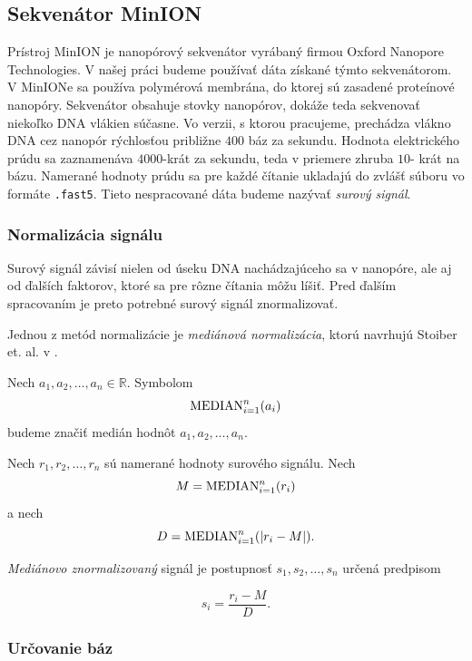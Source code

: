 
\subsection{Sekvenátor MinION}

Prístroj MinION je nanopórový sekvenátor vyrábaný firmou Oxford Nanopore Technologies. V našej práci 
budeme používať dáta získané týmto sekvenátorom. V MinIONe sa používa polymérová membrána, do ktorej sú 
zasadené proteínové nanopóry. Sekvenátor obsahuje stovky nanopórov, dokáže teda sekvenovať niekoľko DNA 
vlákien súčasne.
Vo verzii, s ktorou pracujeme, prechádza vlákno DNA cez nanopór rýchlosťou približne $400$ báz za 
sekundu. Hodnota elektrického prúdu sa zaznamenáva $4000$-krát za sekundu, teda v priemere zhruba $10$-
krát na bázu. Namerané hodnoty prúdu sa pre každé čítanie ukladajú do zvlášť súboru vo formáte 
\texttt{.fast5}. Tieto nespracované dáta budeme nazývať \emph{surový signál}.


\subsubsection{Normalizácia signálu}

Surový signál závisí nielen od úseku DNA nachádzajúceho sa v nanopóre, ale aj od ďalších faktorov, ktoré 
sa pre rôzne čítania môžu líšiť. Pred ďalším spracovaním je preto potrebné surový signál znormalizovať.

Jednou z metód normalizácie je \emph{mediánová normalizácia}, ktorú navrhujú Stoiber et. al. v 
\cite{Stoiber2017}.

\begin{definicia}
Nech $a_1, a_2, \dots, a_n \in \mathbb{R}$. Symbolom
$$\median{i=1}{n}(a_i)$$
budeme značiť medián hodnôt $a_1, a_2, \dots, a_n$.
\end{definicia}

\begin{definicia}
Nech $r_1, r_2, \dots, r_n$ sú namerané hodnoty surového signálu. Nech
 $$M = \median{i=1}{n}(r_i)$$ a nech $$D = \median{i=1}{n}(\abs*{r_i - M}) \text{.}$$

\emph{Mediánovo znormalizovaný} signál je postupnosť $s_1, s_2, \dots, s_n$ určená predpisom

$$s_i = \frac{r_i - M}{D} \text{.}$$

\end{definicia}

\subsubsection{Určovanie báz}

